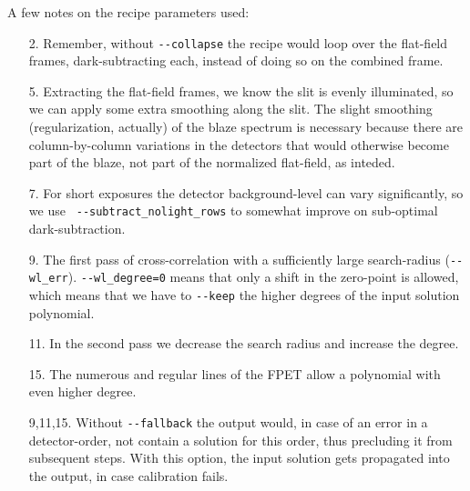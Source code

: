 A few notes on the recipe parameters used:
\begin{enumerate}
  \item[2.] Remember, without \verb!--collapse! the recipe would loop over the
  flat-field frames, dark-subtracting each, instead of doing so on the combined
  frame.
  \item[5.] Extracting the flat-field frames, we know the slit is evenly
  illuminated, so we can apply some extra smoothing along the slit. The slight
  smoothing (regularization, actually) of the blaze spectrum is necessary
  because there are column-by-column variations in the detectors that would
  otherwise become part of the blaze, not part of the normalized flat-field, as
  inteded.
  \item[7.] For short exposures the detector background-level can vary
  significantly, so we use \linebreak \verb! --subtract_nolight_rows! to somewhat improve
  on sub-optimal dark-subtraction.
  \item[9.] The first pass of cross-correlation with a sufficiently large
  search-radius (\verb!--wl_err!). \verb!--wl_degree=0! means that only a shift
  in the zero-point is allowed, which means that we have to \verb!--keep! the
  higher degrees of the input solution polynomial.
  \item[11.] In the second pass we decrease the search radius and increase the
  degree.
  \item[15.] The numerous and regular lines of the FPET allow a polynomial with
  even higher degree.
  \item[9,11,15.] Without \verb!--fallback! the output would, in case of an
  error in a detector-order, not contain a solution for this order, thus
  precluding it from subsequent steps. With this option, the input solution gets
  propagated into the output, in case calibration fails.
\end{enumerate}






